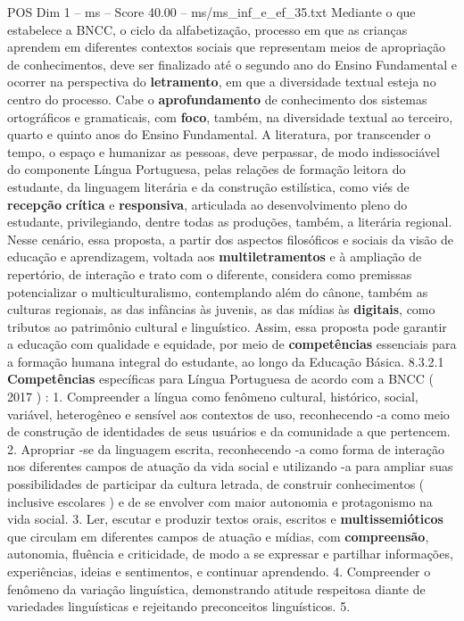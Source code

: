 \begin{textsample}{POS Dim 1 – ms – Score 40.00 – ms/ms\_inf\_e\_ef\_35.txt}
Mediante o que estabelece a BNCC, o ciclo da alfabetização, processo em que as crianças aprendem em diferentes contextos sociais que representam meios de apropriação de conhecimentos, deve ser finalizado até o segundo ano do Ensino Fundamental e ocorrer na perspectiva do \textbf{letramento}, em que a diversidade textual esteja no centro do processo.
Cabe o \textbf{aprofundamento} de conhecimento dos sistemas ortográficos e gramaticais, com \textbf{foco}, também, na diversidade textual ao terceiro, quarto e quinto anos do Ensino Fundamental.
A literatura, por transcender o tempo, o espaço e humanizar as pessoas, deve perpassar, de modo indissociável do componente Língua Portuguesa, pelas relações de formação leitora do estudante, da linguagem literária e da construção estilística, como viés de \textbf{recepção} \textbf{crítica} e \textbf{responsiva}, articulada ao desenvolvimento pleno do estudante, privilegiando, dentre todas as produções, também, a literária regional.
Nesse cenário, essa proposta, a partir dos aspectos filosóficos e sociais da visão de educação e aprendizagem, voltada aos \textbf{multiletramentos} e à ampliação de repertório, de interação e trato com o diferente, considera como premissas potencializar o multiculturalismo, contemplando além do cânone, também as culturas regionais, as das infâncias às juvenis, as das mídias às \textbf{digitais}, como tributos ao patrimônio cultural e linguístico.
Assim, essa proposta pode garantir a educação com qualidade e equidade, por meio de \textbf{competências} essenciais para a formação humana integral do estudante, ao longo da Educação Básica. 8.3.2.1 \textbf{Competências} específicas para Língua Portuguesa de acordo com a BNCC ( 2017 ) : 1.
Compreender a língua como fenômeno cultural, histórico, social, variável, heterogêneo e sensível aos contextos de uso, reconhecendo -a como meio de construção de identidades de seus usuários e da comunidade a que pertencem. 2.
Apropriar -se da linguagem escrita, reconhecendo -a como forma de interação nos diferentes campos de atuação da vida social e utilizando -a para ampliar suas possibilidades de participar da cultura letrada, de construir conhecimentos ( inclusive escolares ) e de se envolver com maior autonomia e protagonismo na vida social. 3.
Ler, escutar e produzir textos orais, escritos e \textbf{multissemióticos} que circulam em diferentes campos de atuação e mídias, com \textbf{compreensão}, autonomia, fluência e criticidade, de modo a se expressar e partilhar informações, experiências, ideias e sentimentos, e continuar aprendendo. 4.
Compreender o fenômeno da variação linguística, demonstrando atitude respeitosa diante de variedades linguísticas e rejeitando preconceitos linguísticos. 5.

\end{textsample}
